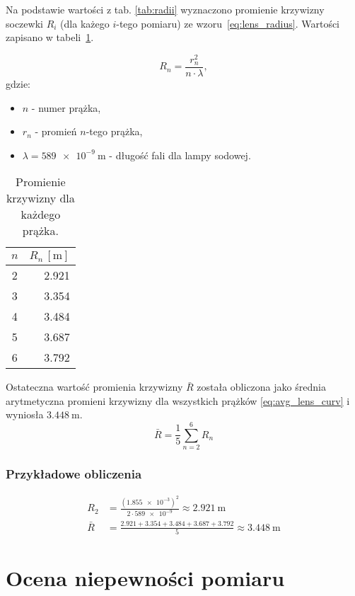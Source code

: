 \documentclass[a4paper,12pt]{article}
\begin{document}
Na podstawie wartości z tab. \ref{tab:radii} wyznaczono promienie krzywizny soczewki $R_i$ (dla każego $i$-tego pomiaru) ze wzoru~\eqref{eq:lens_radius}. Wartości zapisano w tabeli~\ref{tab:radii_and_curvature}.

\begin{equation}
    \label{eq:lens_radius}
    R_n = \frac{r_n^2}{n \cdot \lambda},
\end{equation}
gdzie:
\begin{itemize}
    \item $n$ - numer prążka,
    \item $r_n$ - promień $n$-tego prążka,
    \item $\lambda = \SI{589e-9}{\meter}$ - długość fali dla lampy sodowej.
\end{itemize}

\begin{table}[H]
    \centering
    \begin{tabular}{|c|r|}
        \hline
        \textbf{$n$} & \textbf{$R_n\,[\si{\meter}]$} \\ \hline
        \num{2} & \num{2.921} \\ \hline
        \num{3} & \num{3.354} \\ \hline
        \num{4} & \num{3.484} \\ \hline
        \num{5} & \num{3.687} \\ \hline
        \num{6} & \num{3.792} \\ \hline
    \end{tabular}
    \caption{Promienie krzywizny dla każdego prążka.}
    \label{tab:radii_and_curvature}
\end{table}

Ostateczna wartość promienia krzywizny $\bar R$ została obliczona jako średnia arytmetyczna promieni krzywizny dla wszystkich prążków \eqref{eq:avg_lens_curv} i wyniosła $\SI{3.448}{\meter}$.
\begin{equation}
    \label{eq:avg_lens_curv}
    \bar R =  \frac{1}{5}\sum\limits_{n=2}^{6} R_n
\end{equation}

\subsubsection*{Przykładowe obliczenia}

\begin{align*}
    R_2     & = \frac{(\num{1.855e-3})^2}{2 \cdot \num{589e-9}}  \approx \SI{2.921}{\meter}                              \\
    \bar{R} & = \frac{\num{2.921} + \num{3.354} + \num{3.484} + \num{3.687} + \num{3.792}}{5} \approx \SI{3.448}{\meter}
\end{align*}

\section{Ocena niepewności pomiaru}





\end{document}
